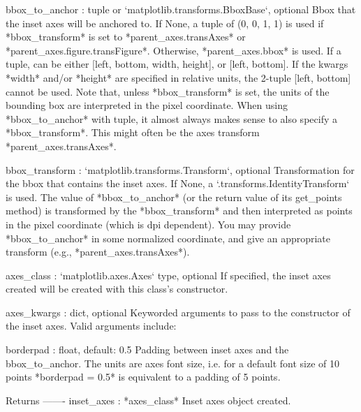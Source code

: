 \begin{DoxyVerb}
bbox_to_anchor : tuple or `matplotlib.transforms.BboxBase`, optional
    Bbox that the inset axes will be anchored to. If None,
    a tuple of (0, 0, 1, 1) is used if *bbox_transform* is set
    to *parent_axes.transAxes* or *parent_axes.figure.transFigure*.
    Otherwise, *parent_axes.bbox* is used. If a tuple, can be either
    [left, bottom, width, height], or [left, bottom].
    If the kwargs *width* and/or *height* are specified in relative units,
    the 2-tuple [left, bottom] cannot be used. Note that,
    unless *bbox_transform* is set, the units of the bounding box
    are interpreted in the pixel coordinate. When using *bbox_to_anchor*
    with tuple, it almost always makes sense to also specify
    a *bbox_transform*. This might often be the axes transform
    *parent_axes.transAxes*.

bbox_transform : `matplotlib.transforms.Transform`, optional
    Transformation for the bbox that contains the inset axes.
    If None, a `.transforms.IdentityTransform` is used. The value
    of *bbox_to_anchor* (or the return value of its get_points method)
    is transformed by the *bbox_transform* and then interpreted
    as points in the pixel coordinate (which is dpi dependent).
    You may provide *bbox_to_anchor* in some normalized coordinate,
    and give an appropriate transform (e.g., *parent_axes.transAxes*).

axes_class : `matplotlib.axes.Axes` type, optional
    If specified, the inset axes created will be created with this class's
    constructor.

axes_kwargs : dict, optional
    Keyworded arguments to pass to the constructor of the inset axes.
    Valid arguments include:


borderpad : float, default: 0.5
    Padding between inset axes and the bbox_to_anchor.
    The units are axes font size, i.e. for a default font size of 10 points
    *borderpad = 0.5* is equivalent to a padding of 5 points.

Returns
-------
inset_axes : *axes_class*
    Inset axes object created.
\end{DoxyVerb}
 \mbox{\label{namespaceaxes__grid1_1_1inset__locator_af5107a77789279613392d10ab773b2c4}} 
